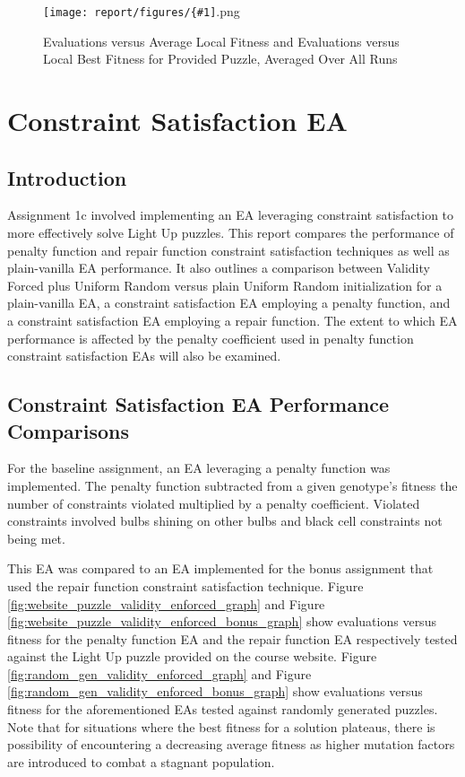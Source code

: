 \documentclass[11pt]{article}
\newcommand{\addgraphic}[1]{\centerline{\texttt{[image: report/figures/\{\#1]}.png}}}
\begin{document}
\begin{figure}
    \addgraphic{website_puzzle_log_graph}
    \caption{Evaluations versus Average Local Fitness and Evaluations versus 
Local Best Fitness for Provided Puzzle, Averaged Over All Runs}
    \label{fig:std_web_norm}
\end{figure}




\section{Constraint Satisfaction EA}

\subsection{Introduction}

Assignment 1c involved implementing an EA leveraging constraint satisfaction to
more effectively solve Light Up puzzles. This report compares the performance of
penalty function and repair function constraint satisfaction techniques as well as
plain-vanilla EA performance. It also outlines a comparison between Validity Forced plus 
Uniform Random versus plain Uniform Random initialization for a plain-vanilla EA,
a constraint satisfaction EA employing a penalty function, and a constraint satisfaction
EA employing a repair function. The extent to which EA performance is affected by 
the penalty coefficient used in penalty function constraint satisfaction EAs will also be examined.


\subsection{Constraint Satisfaction EA Performance Comparisons}

For the baseline assignment, an EA leveraging a penalty function was implemented. The penalty function
subtracted from a given genotype's fitness the number of constraints violated multiplied by a
penalty coefficient. Violated constraints involved bulbs shining on other bulbs and black cell
constraints not being met.

This EA was compared to an EA implemented for the bonus assignment that used the repair function
constraint satisfaction technique. Figure \ref{fig:website_puzzle_validity_enforced_graph} and Figure 
\ref{fig:website_puzzle_validity_enforced_bonus_graph} show evaluations versus fitness for the 
penalty function EA and the repair function EA respectively tested against the Light Up puzzle provided
on the course website. Figure \ref{fig:random_gen_validity_enforced_graph} and Figure \ref{fig:random_gen_validity_enforced_bonus_graph} 
show evaluations versus fitness for the aforementioned EAs tested against randomly generated puzzles. Note that 
for situations where the best fitness for a solution plateaus, there is possibility of encountering a decreasing average fitness
as higher mutation factors are introduced to combat a stagnant population.
\end{document}
